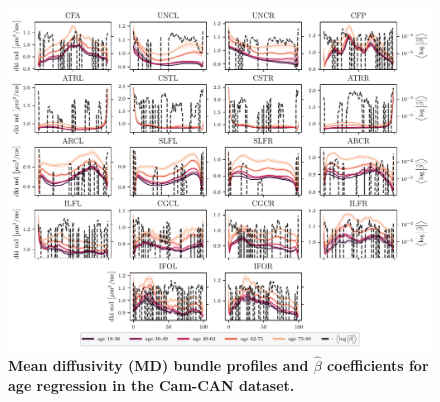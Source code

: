 \documentclass[10pt,%
               aps,%
               prl,%
               reprint,%
               superscriptaddress,%
               preprintnumbers,%
               linenumbers,%
               amsmath,%
               floatfix]{revtex4-2}
\begin{document}
\begin{figure}
    \includegraphics[width=\textwidth]{cc_coefs_profiles_md.pdf}
    \caption{%
        {%
            \bf Mean diffusivity (MD) bundle profiles and $\hat{\beta}$
            coefficients for age regression in the Cam-CAN dataset.
        }
        \label{fig:cc-bp:md}
    }
\end{figure}



\end{document}
